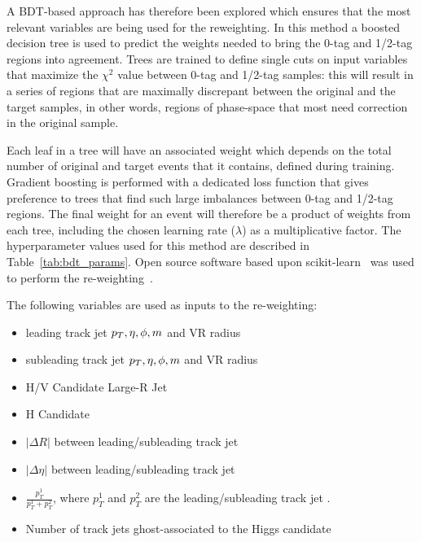A BDT-based approach \cite{BDTrw} has therefore been explored which ensures that the most relevant variables are being used for the reweighting.
In this method a boosted decision tree is used to predict the weights needed to bring the 0-tag and 1/2-tag regions into agreement.
Trees are trained to define single cuts on input variables that maximize the $\chi^{2}$ value between 0-tag and 1/2-tag samples: this will result in a series of regions that are maximally discrepant between the original and the target samples, in other words, regions of phase-space that most need correction in the original sample.

Each leaf in a tree will have an associated weight which depends on the total number of original and target events that it contains, defined during training.
Gradient boosting is performed with a dedicated loss function that gives preference to trees that find such large imbalances between 0-tag and 1/2-tag regions.
The final weight for an event will therefore be a product of weights from each tree, including the chosen learning rate ($\lambda$) as a multiplicative factor.
The hyperparameter values used for this method are described in Table~\ref{tab:bdt_params}.
Open source software based upon scikit-learn~\cite{scikitlearn} was used to perform the re-weighting~\cite{hep_ml:2020arg}.

The following variables are used as inputs to the re-weighting:
\begin{itemize}
    \itemsep -0.5em 
    \item leading track jet $p_{T}, \eta, \phi, m$ and VR radius
    \item subleading track jet $p_{T}, \eta, \phi, m$ and VR radius
    \item H/V Candidate Large-R Jet \pt
    \item H Candidate \ntrk
    \item $\left|\Delta R \right|$ between leading/subleading track jet
    \item $\left|\Delta \eta \right|$ between leading/subleading track jet
    \item $\frac{p_T^1}{p_T^1 + p_T^2}$, where $p_T^1$ and $p_T^2$ are the leading/subleading track jet \pt.
    \item Number of track jets ghost-associated to the Higgs candidate
\end{itemize}

